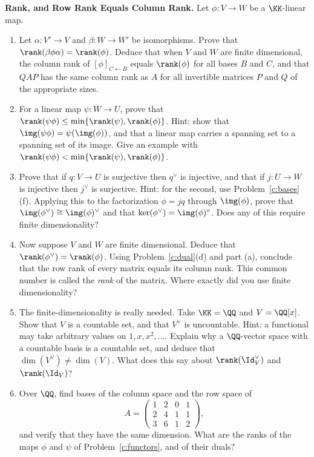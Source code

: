 \documentclass[12pt,reqno]{amsart}
\begin{document}
\begin{problems}
\item\label{c:rank} \textbf{Rank, and Row Rank Equals Column Rank.} Let $\phi:V\to W$ be a $\KK$-linear map.
\begin{enumerate}
\item Let $\alpha:V'\to V$ and $\beta:W\to W'$ be isomorphisms. Prove that $\rank(\beta\phi\alpha)=\rank(\phi)$. Deduce that when $V$ and $W$ are finite dimensional, the column rank of $[\phi]_{C\leftarrow B}$ equals $\rank(\phi)$ for all bases $B$ and $C$, and that $QAP$ has the same column rank as $A$ for all invertible matrices $P$ and $Q$ of the appropriate sizes.
\item For a linear map $\psi:W\to U$, prove that $\rank(\psi\phi)\leq\min\{\rank(\psi),\rank(\phi)\}$. Hint: show that $\img(\psi\phi)=\psi(\img(\phi))$, and that a linear map carries a spanning set to a spanning set of its image. Give an example with $\rank(\psi\phi)<\min\{\rank(\psi),\rank(\phi)\}$.
\item Prove that if $q:V\to U$ is surjective then $q^{\vee}$ is injective, and that if $j:U\to W$ is injective then $j^{\vee}$ is surjective. Hint: for the second, use Problem~\ref{c:bases}(f). Applying this to the factorization $\phi=jq$ through $\img(\phi)$, prove that $\img(\phi^{\vee})\cong\img(\phi)^{\vee}$ and that $\ker(\phi^{\vee})=\img(\phi)^\circ$. Does any of this require finite dimensionality?
\item Now suppose $V$ and $W$ are finite dimensional. Deduce that $\rank(\phi^{\vee})=\rank(\phi)$. Using Problem~\ref{c:dual}(d) and part (a), conclude that the row rank of every matrix equals its column rank. This common number is called the \emph{rank} of the matrix. Where exactly did you use finite dimensionality?
\item The finite-dimensionality is really needed. Take $\KK=\QQ$ and $V=\QQ[x]$. Show that $V$ is a countable set, and that $V^{\vee}$ is uncountable. Hint: a functional may take arbitrary values on $1,x,x^2,\ldots$. Explain why a $\QQ$-vector space with a countable basis is a countable set, and deduce that $\dim(V^{\vee})\neq\dim(V)$. What does this say about $\rank(\Id_V^{\vee})$ and $\rank(\Id_V)$?
\item Over $\QQ$, find bases of the column space and the row space of
\[
A=\begin{pmatrix}1&2&0&1\\2&4&1&1\\3&6&1&2\end{pmatrix},
\]
and verify that they have the same dimension. What are the ranks of the maps $\phi$ and $\psi$ of Problem~\ref{c:functors}, and of their duals?
\end{enumerate}
\end{problems}
\end{document}

